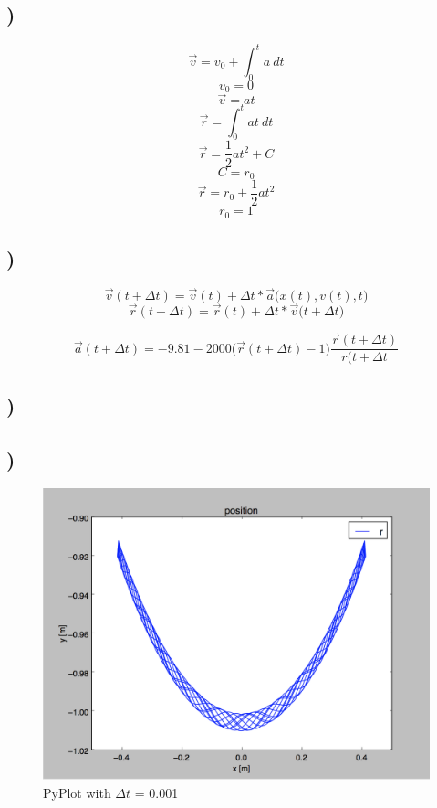 \documentclass[a4paper,10pt,norsk]{article}
\begin{document}
\subsection{)}
\[\vec{v} = v_{0} + \int_{0}^{t}a \  dt\]
\[v_{0} = 0\]
\[\vec{v} = at\]
\[\vec{r} = \int_{0}^{t} at \ dt\]
\[\vec{r} = \frac{1}{2} at^{2} + C\]
\[C = r_{0}\]
\[\vec{r} = r_{0} + \frac{1}{2} at^{2}\]
\[r_{0} = 1\]
 
 \subsection{)}
 \[\vec{v}(t + \Delta t) = \vec{v}(t) + \Delta t * \vec{a}\big(x(t), v(t), t\big)\]
 \[\vec{r}(t + \Delta t) = \vec{r}(t) + \Delta t * \vec{v}\big(t + \Delta t\big)\]
 
 \[\vec{a}(t + \Delta t) = -9.81 - 2000\big(\vec{r}(t + \Delta t) - 1\big)\frac{\vec{r}(t + \Delta t)}{r(t + \Delta t}\]
 
 \subsection{)}
 
 
 \subsection{)}
 
 \begin{figure}[h!]
        \centering 
        \includegraphics[scale=0.4]{oppg_j.png} 
        \caption{PyPlot with $\Delta t$ = 0.001}
\end{figure}
 
\end{document}
